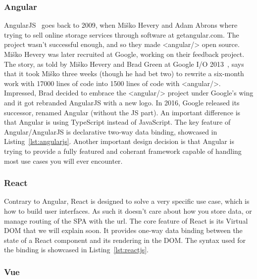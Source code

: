 \subsubsection{Angular}%
\label{ssub:angular}

AngularJS~\cite{hevery2009declarative} goes back to 2009, when Miško Hevery and Adam Abrons
where trying to sell online storage services through software at getangular.com.
The project wasn't successful enough, and so they made <angular/> open source.
Miško Hevery was later recruited at Google, working on their feedback project.
The story, as told by Miško Hevery and Brad Green at Google I/O 2013~\cite{angularjs-googleio},
says that it took Miško three weeks (though he had bet two) to rewrite a six-month work
with 17000 lines of code into 1500 lines of code with <angular/>.
Impressed, Brad decided to embrace the <angular/> project under Google's wing
and it got rebranded AngularJS with a new logo.
In 2016, Google released its successor, renamed Angular (without the JS part).
An important difference is that Angular is using TypeScript instead of JavaScript.
The key feature of Angular/AngularJS is declarative two-way data binding,
showcased in Listing~\ref{lst:angularjs}.
Another important design decision is that Angular is trying
to provide a fully featured and coherant framework
capable of handling most use cases you will ever encounter.



\subsubsection{React}%
\label{ssub:react}

Contrary to Angular, React is designed to solve a very specific use case,
which is how to build user interfaces.
As such it doesn't care about how you store data,
or manage routing of the SPA with the url.
The core feature of React is its Virtual DOM that we will explain soon.
It provides one-way data binding between the state of a React component
and its rendering in the DOM.\@
The syntax used for the binding is showcased in Listing~\ref{lst:reactjs}.




\subsubsection{Vue}%
\label{ssub:vue}

